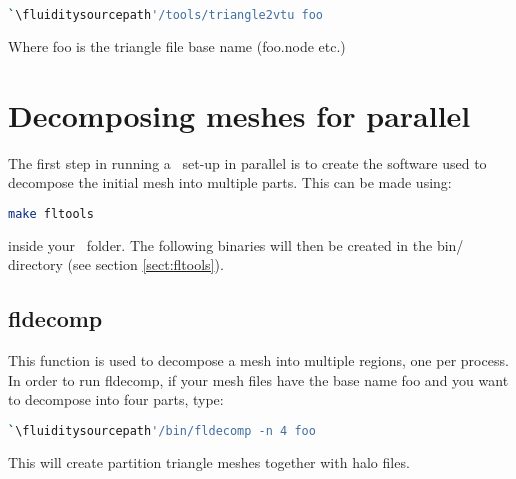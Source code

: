 \begin{lstlisting}[language = Bash]
`\fluiditysourcepath'/tools/triangle2vtu foo
\end{lstlisting}

Where foo is the triangle file base name (\ie foo.node etc.)

\section{Decomposing meshes for parallel}
\label{decomp_meshes_parallel}

The first step in running a \fluidity\ set-up in parallel is to create the software
used to decompose the initial mesh into multiple parts. This can be made using:
\begin{lstlisting}[language=bash]
make fltools
\end{lstlisting}
inside your \fluidity\ folder. The following binaries will then be created in the bin/ directory (see section \ref{sect:fltools}).

\subsection{fldecomp}
This function is used to decompose a mesh into multiple regions, one per process. In order to run fldecomp, if your mesh files have the base name foo and you want to decompose into four parts, type:
\begin{lstlisting}[language = Bash]
`\fluiditysourcepath'/bin/fldecomp -n 4 foo
\end{lstlisting}

This will create partition triangle meshes together with halo files. 


